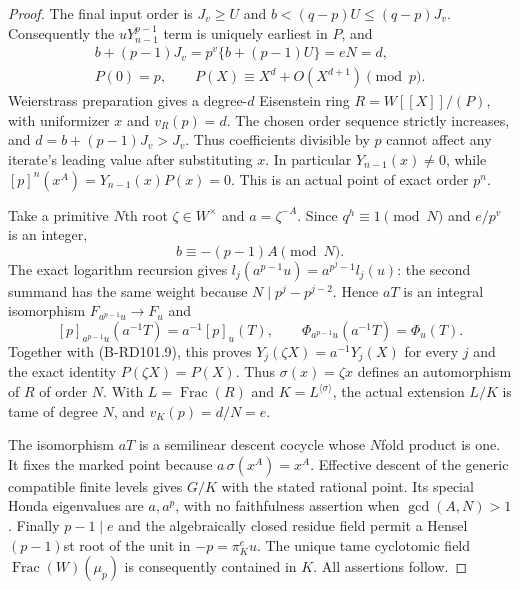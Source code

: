 \begin{proof}
The final input order is $J_v\ge U$ and
$b<(q-p)U\le(q-p)J_v$. Consequently the
$uY_{n-1}^{p-1}$ term is uniquely earliest in $P$, and
\[
\begin{gathered}
 b+(p-1)J_v=p^v\{b+(p-1)U\}=eN=d,\\
 P(0)=p,\qquad P(X)\equiv X^d+O(X^{d+1})\pmod p .
\end{gathered}
                                                        \tag{B-RD101.8}
\]
Weierstrass preparation gives a degree-$d$ Eisenstein
ring $R=W[[X]]/(P)$, with uniformizer $x$ and
$v_R(p)=d$. The chosen order sequence strictly increases,
and $d=b+(p-1)J_v>J_v$. Thus coefficients divisible by
$p$ cannot affect any iterate's leading value after
substituting $x$. In particular
$Y_{n-1}(x)\ne0$, while
$[p]^n(x^A)=Y_{n-1}(x)P(x)=0$.
This is an actual point of exact order $p^n$.

Take a primitive $N$th root $\zeta\in W^\times$ and
$a=\zeta^{-A}$. Since $q^h\equiv1\pmod N$ and
$e/p^v$ is an integer,
\[
                         b\equiv-(p-1)A\pmod N .
                                                        \tag{B-RD101.9}
\]
The exact logarithm recursion gives
$l_j(a^{p-1}u)=a^{p^j-1}l_j(u)$:
the second summand has the same weight because
$N\mid p^j-p^{j-2}$.
Hence $aT$ is an integral isomorphism
$F_{a^{p-1}u}\to F_u$ and
\[
 [p]_{a^{p-1}u}(a^{-1}T)=a^{-1}[p]_u(T),\qquad
 \Phi_{a^{p-1}u}(a^{-1}T)=\Phi_u(T).                  \tag{B-RD101.10}
\]
Together with (B-RD101.9), this proves
$Y_j(\zeta X)=a^{-1}Y_j(X)$ for every $j$ and the
exact identity $P(\zeta X)=P(X)$.
Thus $\sigma(x)=\zeta x$ defines an automorphism of
$R$ of order $N$. With $L=\operatorname{Frac}(R)$
and $K=L^{\langle\sigma\rangle}$, the actual extension
$L/K$ is tame of degree $N$, and $v_K(p)=d/N=e$.

The isomorphism $aT$ is a semilinear descent cocycle
whose $N$fold product is one. It fixes the marked point
because $a\,\sigma(x^A)=x^A$.
Effective descent of the generic compatible finite
levels gives $G/K$ with the stated rational point.
Its special Honda eigenvalues are $a,a^p$, with
no faithfulness assertion when $\gcd(A,N)>1$.
Finally $p-1\mid e$ and the algebraically closed residue
field permit a Hensel $(p-1)$st root of the unit in
$-p=\pi_K^e u$. The unique tame cyclotomic field
$\operatorname{Frac}(W)(\mu_p)$ is consequently
contained in $K$. All assertions follow.
\end{proof}


